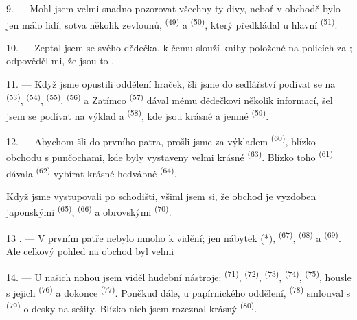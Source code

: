 9. --- Mohl jsem velmi snadno pozorovat všechny ty divy, neboť v obchodě bylo jen málo
lidí, sotva několik zevlounů,  \textsuperscript{(49)} a
 \textsuperscript{(50)}, který předkládal  u hlavní
 \textsuperscript{(51)}.

10. --- Zeptal jsem se svého dědečka, k čemu slouží knihy položené na policích za
; odpověděl mi, že jsou to .

\VUsaut{3.6mm}
\VUsaut{2.8mm}

11. --- Když jsme opustili oddělení hraček, šli jsme do sedlářství podívat se na
 \textsuperscript{(53)},  \textsuperscript{(54)},
 \textsuperscript{(55)},  \textsuperscript{(56)} a
 Zatímco  \textsuperscript{(57)} dával
mému dědečkovi několik informací, šel jsem se podívat na výklad  a
 \textsuperscript{(58)}, kde jsou krásné  a
jemné  \textsuperscript{(59)}.

12. --- Abychom šli do prvního patra, prošli jsme za výkladem 
\textsuperscript{(60)}, blízko obchodu s punčochami, kde byly vystaveny velmi krásné
 \textsuperscript{(63)}. Blízko toho 
\textsuperscript{(61)} dávala  \textsuperscript{(62)} vybírat krásné
hedvábné  \textsuperscript{(64)}.

Když jsme vystupovali po schodišti, všiml jsem si, že obchod je vyzdoben japonskými
 \textsuperscript{(65)},  \textsuperscript{(66)} a
obrovskými  \textsuperscript{(70)}.

13 . --- V prvním patře nebylo mnoho k vidění; jen nábytek (*),  \textsuperscript{(67)},  \textsuperscript{(68)} a
 \textsuperscript{(69)}. Ale celkový pohled na obchod byl velmi

14. --- U našich nohou jsem viděl hudební nástroje: 
\textsuperscript{(71)},  \textsuperscript{(72)}, 
\textsuperscript{(73)},  \textsuperscript{(74)},
 \textsuperscript{(75)}, housle s jejich 
\textsuperscript{(76)} a dokonce  \textsuperscript{(77)}. Poněkud
dále, u papírnického oddělení,  \textsuperscript{(78)} smlouval s
 \textsuperscript{(79)} o desky na sešity. Blízko nich jsem rozeznal
krásný  \textsuperscript{(80)}.

